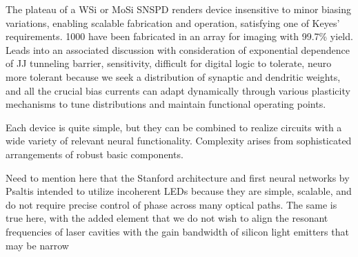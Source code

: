 \vspace{3em}
The plateau of a WSi or MoSi SNSPD renders device insensitive to minor biasing variations, enabling scalable fabrication and operation, satisfying one of Keyes' requirements. 1000 have been fabricated in an array for imaging with 99.7\% yield. Leads into an associated discussion with consideration of exponential dependence of JJ tunneling barrier, sensitivity, difficult for digital logic to tolerate, neuro more tolerant because we seek a distribution of synaptic and dendritic weights, and all the crucial bias currents can adapt dynamically through various plasticity mechanisms to tune distributions and maintain functional operating points.

\vspace{3em}
Each device is quite simple, but they can be combined to realize circuits with a wide variety of relevant neural functionality. Complexity arises from sophisticated arrangements of robust basic components.


\vspace{3em}
Need to mention here that the Stanford architecture and first neural networks by Psaltis intended to utilize incoherent LEDs because they are simple, scalable, and do not require precise control of phase across many optical paths. The same is true here, with the added element that we do not wish to align the resonant frequencies of laser cavities with the gain bandwidth of silicon light emitters that may be narrow